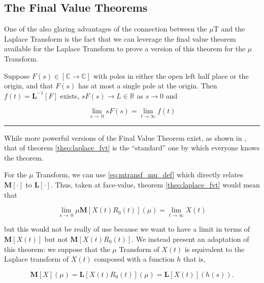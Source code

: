 \subsection{The Final Value Theorems}

	One of the also glaring advantages of the connection between the $\mu$T and the Laplace Transform is the fact that we can leverage the final value theorem available for the Laplace Transform to prove a version of this theorem for the $\mu$ Transform.

\begin{theorem}\label{theo:laplace_fvt}
	Suppose $F(s)\in\left[\mathbb{C}\to\mathbb{C}\right]$ with poles in either the open left half place or the origin, and that $F(s)$ has at most a single pole at the origin. Then $f(t) = \mathbf{L}^{-1}\left[F\right]$ exists, $sF(s)\to L\in\mathbb{R}$ as $s\to 0$ and

\begin{equation} \lim\limits_{s\to\ 0} sF(s) = \lim\limits_{t\to\infty} f(t) \end{equation}
\end{theorem}
\hrule
\vspace{3mm}

	While more powerful versions of the Final Value Theorem exist, as shown in \cite{chenFinalValueTheorem2007}, that of theorem \ref{theo:laplace_fvt} is the ``standard'' one by which everyone knows the theorem.

	For the $\mu$ Transform, we can use \eqref{eq:mtransf_mu_def} which directly relates $\mathbf{M}\left[\cdot\right]$ to $\mathbf{L}\left[\cdot\right]$. Thus, taken at face-value, theorem \ref{theo:laplace_fvt} would mean that

\begin{equation} \lim\limits_{s\to\ 0} \mu \mathbf{M}\left[X(t) R_0(t)\right]\left(\mu\right) = \lim\limits_{t\to\infty} X(t) \end{equation}

	\noindent but this would not be really of use because we want to have a limit in terms of $\mathbf{M}\left[X(t)\right]$ but not $\mathbf{M}\left[X(t) R_0(t)\right]$. We instead present an adaptation of this theorem: we suppose that the $\mu$ Transform of $X(t)$ is equivalent to the Laplace transform of $X(t)$ composed with a function $h$ that is,

\begin{equation} \mathbf{M}\left[X\right](\mu) = \mathbf{L}\left[X(t)R_0(t)\right](\mu) = \mathbf{L}\left[X(t)\right]\left(h\left(s\right)\right). \end{equation}

